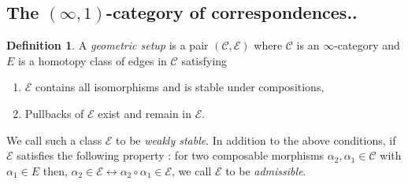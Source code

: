 \documentclass[14pt]{article}
\theoremstyle{definition}
\newtheorem{definition}[theorem]{Definition}
\newcommand{\E}{\mathcal{E}}
\newcommand{\Ca}{\mathcal{C}}
\numberwithin{subsection}{section}
\begin{document}
    \subsection{ The $(\infty,1)$-category of correspondences..}
    \begin{definition}\cite[Definition A.5.1]{mann2022padic}
        A \textit{geometric setup} is a pair $(\Ca,\E)$ where $\Ca$ is an $\infty$-category and $E$ is a homotopy class of edges in $\Ca$ satisfying
        \begin{enumerate}
            \item $\E$ contains all isomorphisms and is stable under compositions,

           \item Pullbacks of $\E$ exist and remain in $\E$.
        \end{enumerate}
        We call such a class $\E$ to be \textit{weakly stable}. In addition to the above conditions, if $\E$ satisfies the following property :  for two composable morphisms $\alpha_2,\alpha_1 \in \Ca$ with $\alpha_1 \in E$ then, $\alpha_2 \in \E \leftrightarrow \alpha_2 \circ \alpha_1 \in \E$, we call $\E$ to be \textit{admissible}. 
    \end{definition}
\end{document}
